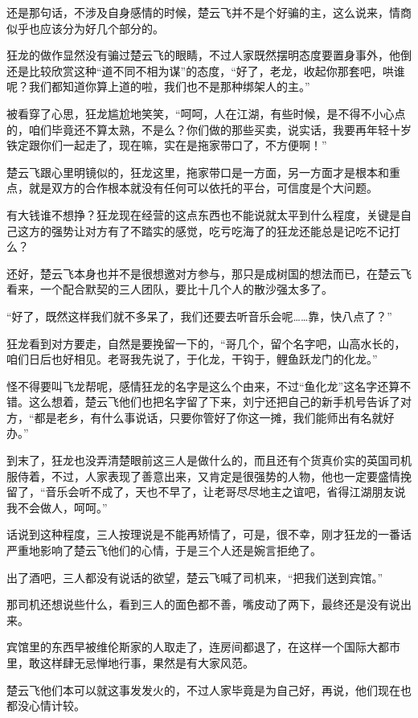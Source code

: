 还是那句话，不涉及自身感情的时候，楚云飞并不是个好骗的主，这么说来，情商似乎也应该分为好几个部分的。

狂龙的做作显然没有骗过楚云飞的眼睛，不过人家既然摆明态度要置身事外，他倒还是比较欣赏这种“道不同不相为谋”的态度，“好了，老龙，收起你那套吧，哄谁呢？我们都知道你算上道的啦，我们也不是那种绑架人的主。”

被看穿了心思，狂龙尴尬地笑笑，“呵呵，人在江湖，有些时候，是不得不小心点的，咱们毕竟还不算太熟，不是么？你们做的那些买卖，说实话，我要再年轻十岁铁定跟你们一起走了，现在嘛，实在是拖家带口了，不方便啊！”

楚云飞跟心里明镜似的，狂龙这里，拖家带口是一方面，另一方面才是根本和重点，就是双方的合作根本就没有任何可以依托的平台，可信度是个大问题。

有大钱谁不想挣？狂龙现在经营的这点东西也不能说就太平到什么程度，关键是自己这方的强势让对方有了不踏实的感觉，吃亏吃海了的狂龙还能总是记吃不记打么？

还好，楚云飞本身也并不是很想邀对方参与，那只是成树国的想法而已，在楚云飞看来，一个配合默契的三人团队，要比十几个人的散沙强太多了。

“好了，既然这样我们就不多呆了，我们还要去听音乐会呢……靠，快八点了？”

狂龙看到对方要走，自然是要挽留一下的，“哥几个，留个名字吧，山高水长的，咱们日后也好相见。老哥我先说了，于化龙，干钩于，鲤鱼跃龙门的化龙。”

怪不得要叫飞龙帮呢，感情狂龙的名字是这么个由来，不过“鱼化龙”这名字还算不错。这么想着，楚云飞他们也把名字留了下来，刘宁还把自己的新手机号告诉了对方，“都是老乡，有什么事说话，只要你管好了你这一摊，我们能师出有名就好办。”

到末了，狂龙也没弄清楚眼前这三人是做什么的，而且还有个货真价实的英国司机服侍着，不过，人家表现了善意出来，又肯定是很强势的人物，他也一定要盛情挽留了，“音乐会听不成了，天也不早了，让老哥尽尽地主之谊吧，省得江湖朋友说我不会做人，呵呵。”

话说到这种程度，三人按理说是不能再矫情了，可是，很不幸，刚才狂龙的一番话严重地影响了楚云飞他们的心情，于是三个人还是婉言拒绝了。

出了酒吧，三人都没有说话的欲望，楚云飞喊了司机来，“把我们送到宾馆。”

那司机还想说些什么，看到三人的面色都不善，嘴皮动了两下，最终还是没有说出来。

宾馆里的东西早被维伦斯家的人取走了，连房间都退了，在这样一个国际大都市里，敢这样肆无忌惮地行事，果然是有大家风范。

楚云飞他们本可以就这事发发火的，不过人家毕竟是为自己好，再说，他们现在也都没心情计较。

